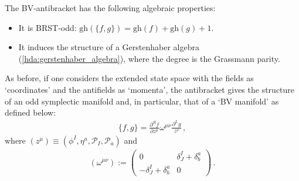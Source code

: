     \begin{property}
        The BV-antibracket has the following algebraic properties:
        \begin{itemize}
            \item It is BRST-odd: $\mathrm{gh}(\{f,g\}) = \mathrm{gh}(f)+\mathrm{gh}(g)+1$.
            \item It induces the structure of a Gerstenhaber algebra (\cref{hda:gerstenhaber_algebra}), where the degree is the Grassmann parity.
        \end{itemize}
        As before, if one considers the extended state space with the fields as `coordinates' and the antifields as `momenta', the antibracket gives the structure of an odd symplectic manifold and, in particular, that of a `BV manifold' as defined below:
        \begin{gather}
            \{f,g\} = \frac{\partial^Rf}{\partial z^\mu}\omega^{\mu\nu}\frac{\partial^Lg}{z^\nu}\,,
        \end{gather}
        where $(z^\mu)\equiv(\phi^I,\eta^a,\mathcal{P}_I,\mathcal{P}_a)$ and
        \begin{gather}
            (\omega^{\mu\nu}) :=
            \begin{pmatrix}
                0&\delta^I_J+\delta^a_b\\
                -\delta^I_J+\delta^a_b&0
            \end{pmatrix}\,.
        \end{gather}
    \end{property}

